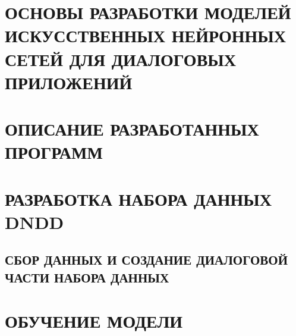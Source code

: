 \documentclass{thesis}
\begin{document}

\tableofcontents                          %
\thispagestyle{empty}


\chapter{ОСНОВЫ РАЗРАБОТКИ МОДЕЛЕЙ ИСКУССТВЕННЫХ НЕЙРОННЫХ СЕТЕЙ ДЛЯ ДИАЛОГОВЫХ ПРИЛОЖЕНИЙ}


\chapter{ОПИСАНИЕ РАЗРАБОТАННЫХ ПРОГРАММ}


\chapter{РАЗРАБОТКА НАБОРА ДАННЫХ DNDD}
\section{СБОР ДАННЫХ И СОЗДАНИЕ ДИАЛОГОВОЙ ЧАСТИ НАБОРА ДАННЫХ}


\chapter{ОБУЧЕНИЕ МОДЕЛИ}



\break



\appendix

\end{document}
